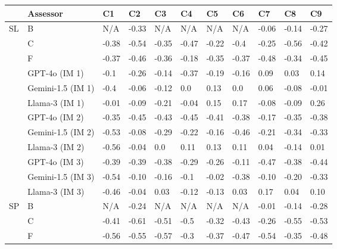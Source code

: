 \begin{table}[]
    \small
    \centering

\begin{tabular}{lllllllllll}
\toprule
 &          Assessor &    C1 &    C2 &    C3 &    C4 &    C5 &    C6 &    C7 &    C8 &    C9 \\
\midrule
   SL &                 B &   N/A & -0.33 &   N/A &   N/A &   N/A &   N/A & -0.06 & -0.14 & -0.27 \\
   &                 C & -0.38 & -0.54 & -0.35 & -0.47 & -0.22 &  -0.4 & -0.25 & -0.56 & -0.42 \\
   &                 F & -0.37 & -0.46 & -0.36 & -0.18 & -0.35 & -0.37 & -0.48 & -0.34 & -0.45 \\ [0.15cm]
   
   &     GPT-4o (IM 1) &  -0.1 & -0.26 & -0.14 & -0.37 & -0.19 & -0.16 &  0.09 &  0.03 &  0.14 \\
    & Gemini-1.5 (IM 1) &  -0.4 & -0.06 & -0.12 &   0.0 &  0.13 &   0.0 &  0.06 & -0.08 & -0.01 \\
   &    Llama-3 (IM 1) & -0.01 & -0.09 & -0.21 & -0.04 &  0.15 &  0.17 & -0.08 & -0.09 &  0.26 \\ [0.15cm]
   
   &     GPT-4o (IM 2) & -0.35 & -0.45 & -0.43 & -0.45 & -0.41 & -0.38 & -0.17 & -0.35 & -0.38 \\
   & Gemini-1.5 (IM 2) & -0.53 & -0.08 & -0.29 & -0.22 & -0.16 & -0.46 & -0.21 & -0.34 & -0.33 \\
   &    Llama-3 (IM 2) & -0.56 & -0.04 &   0.0 &  0.11 &  0.13 &  0.11 &  0.04 & -0.14 &  0.01 \\ [0.15cm]

   &     GPT-4o (IM 3) & -0.39 & -0.39 & -0.38 & -0.29 & -0.26 & -0.11 & -0.47 & -0.38 & -0.44 \\
   & Gemini-1.5 (IM 3) & -0.54 & -0.10 & -0.16 &  -0.1 & -0.02 & -0.38 & -0.10 & -0.20 & -0.33 \\
   &    Llama-3 (IM 3) & -0.46 & -0.04 &  0.03 & -0.12 & -0.13 &  0.03 &  0.17 &  0.04 &  0.10 \\ \midrule
   
  SP &                 B &   N/A & -0.24 &   N/A &   N/A &   N/A &   N/A & -0.01 & -0.14 & -0.28 \\
   &                 C & -0.41 & -0.61 & -0.51 &  -0.5 & -0.32 & -0.43 & -0.26 & -0.55 & -0.53 \\
   &                 F & -0.56 & -0.55 & -0.57 &  -0.3 & -0.37 & -0.47 & -0.54 & -0.35 & -0.48 \\ [0.15cm]
   

\end{tabular}
\end{table}
